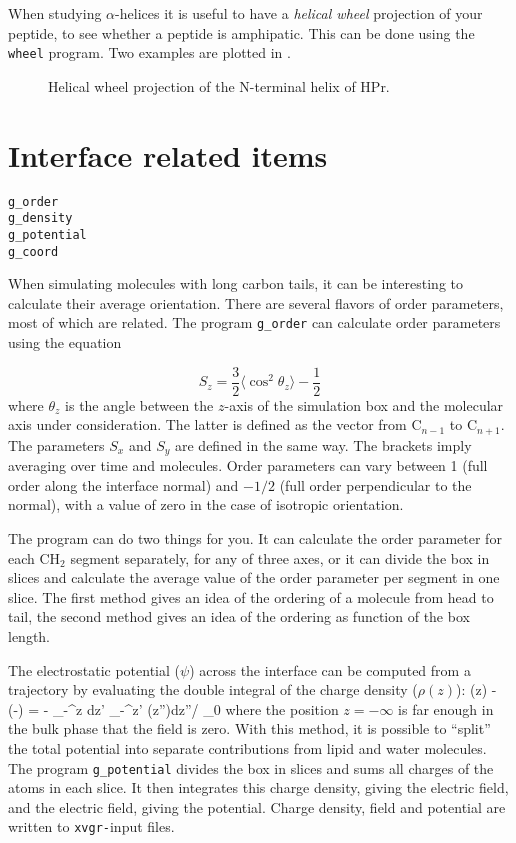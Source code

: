 When studying $\alpha$-helices 
it is useful to have a {\em helical wheel} projection
of your peptide, to see whether a peptide is amphipatic. This can be done
using the {\tt wheel} program. Two examples are 
plotted in .

\begin{figure}
\centerline{}
\caption{Helical wheel projection of the N-terminal helix of HPr.}
\label{fig:wheel}
\end{figure}


\section{Interface related items}
\begin{verbatim}
g_order
g_density
g_potential
g_coord
\end{verbatim}

When simulating molecules with long carbon tails, it can be
interesting to calculate their average orientation. There are several
flavors of order parameters, most of which are related. The program
{\tt g\_order} can calculate order parameters using the equation

\begin{equation}
S_{z} = \frac{3}{2}\langle {\cos^2{\theta_z}} \rangle - \frac{1}{2}
\label{eqn:Sgr}
\end{equation}
where $\theta_z$ is the angle between the $z$-axis of the simulation
box and the molecular axis under consideration. The latter is defined as the
vector from C$_{n-1}$ to C$_{n+1}$. The parameters $S_x$
and $S_y$ are defined in the same way. The brackets imply averaging over time
and molecules. Order parameters can vary between 1 (full order along
the interface normal) and $-1/2$ (full order perpendicular to the
normal), with a value of zero in the case of isotropic orientation.

The program can do two things for you. It can calculate the order
parameter for each CH$_2$ segment separately, for any of three axes,
or it can divide the box in slices and calculate the average value of
the order parameter per segment in one slice. The first method gives
an idea of the ordering of a molecule from head to tail, the second
method gives an idea of the ordering as function of the box length.

The electrostatic potential ($\psi$) across the interface can be
computed from a trajectory by evaluating the double integral of the
charge density ($\rho(z)$):
\beq
\psi(z) - \psi(-\infty) = - \int_{-\infty}^z dz' \int_{-\infty}^{z'} \rho(z'')dz''/ \epsilon_0 
\label{eqn:elpotgr}
\eeq
where the position $z=-\infty$ is far enough in the bulk phase that
the field is zero.  With this method, it is possible to ``split'' the
total potential into separate contributions from lipid and water
molecules. The program {\tt g\_potential} divides the box in slices and
sums all charges of the atoms in each slice. It then integrates this
charge density, giving the electric field, and the electric field,
giving the potential. Charge density, field and potential are written
to {\tt xvgr-}input files.

